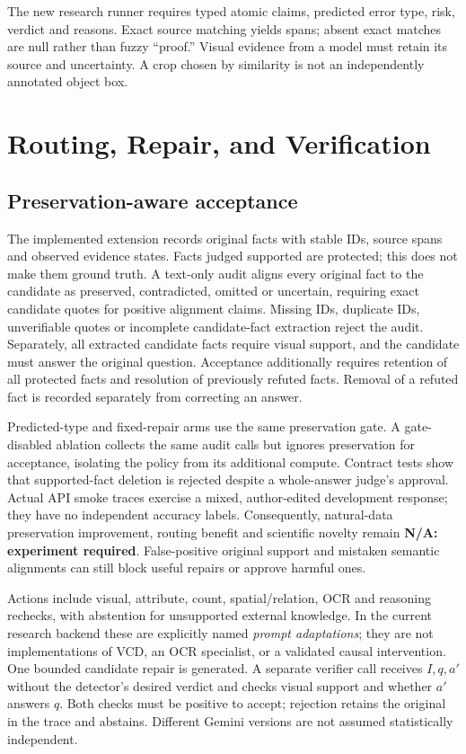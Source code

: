 \documentclass[conference]{IEEEtran}
\newcommand{\missing}{\textbf{N/A: experiment required}}
\begin{document}
The new research runner requires typed atomic claims, predicted error type,
risk, verdict and reasons. Exact source matching yields spans; absent exact
matches are null rather than fuzzy ``proof.'' Visual evidence from a model
must retain its source and uncertainty. A crop chosen by similarity is not
an independently annotated object box.

\section{Routing, Repair, and Verification}
\subsection{Preservation-aware acceptance}
The implemented extension records original facts with stable IDs, source spans
and observed evidence states. Facts judged supported are protected; this does
not make them ground truth. A text-only audit aligns every original fact to the
candidate as preserved, contradicted, omitted or uncertain, requiring exact
candidate quotes for positive alignment claims. Missing IDs, duplicate IDs,
unverifiable quotes or incomplete candidate-fact extraction reject the audit.
Separately, all extracted candidate facts require visual support, and the
candidate must answer the original question. Acceptance additionally requires
retention of all protected facts and resolution of previously refuted facts.
Removal of a refuted fact is recorded separately from correcting an answer.

Predicted-type and fixed-repair arms use the same preservation gate. A
gate-disabled ablation collects the same audit calls but ignores preservation
for acceptance, isolating the policy from its additional compute. Contract
tests show that supported-fact deletion is rejected despite a whole-answer
judge's approval. Actual API smoke traces exercise a mixed, author-edited
development response; they have no independent accuracy labels. Consequently,
natural-data preservation improvement, routing benefit and scientific novelty
remain \missing. False-positive original support and mistaken semantic
alignments can still block useful repairs or approve harmful ones.

Actions include visual, attribute, count, spatial/relation, OCR and reasoning
rechecks, with abstention for unsupported external knowledge. In the current
research backend these are explicitly named \emph{prompt adaptations}; they
are not implementations of VCD, an OCR specialist, or a validated causal
intervention. One bounded candidate repair is generated. A separate verifier
call receives $I,q,a'$ without the detector's desired verdict and checks
visual support and whether $a'$ answers $q$. Both checks must be positive to
accept; rejection retains the original in the trace and abstains. Different
Gemini versions are not assumed statistically independent.
\end{document}
